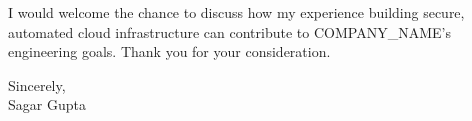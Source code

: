 \documentclass[a4paper,11pt]{article}
\begin{document}
\vspace{3mm}
\noindent
I would welcome the chance to discuss how my experience building secure, automated cloud infrastructure can contribute to COMPANY\_NAME's engineering goals. Thank you for your consideration.

\vspace{6mm}
\noindent
Sincerely, \\
Sagar Gupta
\end{document}
